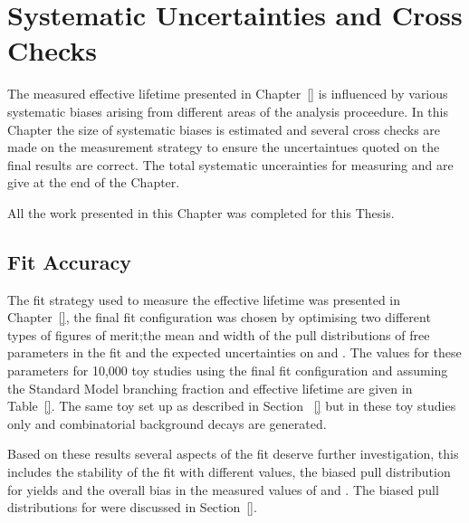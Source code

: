 \chapter{Systematic Uncertainties and Cross Checks}
\label{sec:systematics}
The measured \bsmumu effective lifetime presented in Chapter~\ref{} is influenced by various systematic biases arising from different areas of the analysis proceedure. In this Chapter the size of systematic biases is estimated and several cross checks are made on the measurement strategy to ensure the uncertaintues quoted on the final results are correct. The total systematic uncerainties for measuring \tmumu and \Gmumu are give at the end of the Chapter.

All the work presented in this Chapter was completed for this Thesis.

\section{Fit Accuracy}
\label{sec:fitaccuracy}
The fit strategy used to measure the \bsmumu effective lifetime was presented in Chapter~\ref{}, the final fit configuration was chosen by optimising two different types of figures of merit;the mean and width of the pull distributions of free parameters in the fit and the expected uncertainties on \tmumu and \Gmumu. The values for these parameters for 10,000 toy studies using the final fit configuration and assuming the Standard Model \bsmumu branching fraction and effective lifetime are given in Table~\ref{}. The same toy set up as described in Section ~\ref{} but in these toy studies only \bsmumu and combinatorial background decays are generated. 


Based on these results several aspects of the fit deserve further investigation, this includes the stability of the fit with different \tmumu values, the biased pull distribution for \bsmumu yields and the overall bias in the measured values of \tmumu and \Gmumu. The biased pull distributions for \tmumu were discussed in Section~\ref{}.

